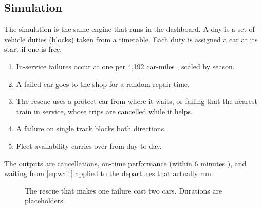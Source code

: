 \documentclass[11pt]{article}
\begin{document}
\subsection{Simulation}
The simulation is the same engine that runs in the dashboard. A day is a set of vehicle duties (blocks) taken from a timetable. Each duty is assigned a car at its start if one is free.
\begin{enumerate}
\item In-service failures occur at one per 4{,}192 car-miles \citep{roinj2025riverline}, scaled by season.
\item A failed car goes to the shop for a random repair time.
\item The rescue uses a protect car from where it waits, or failing that the nearest train in service, whose trips are cancelled while it helps.
\item A failure on single track blocks both directions.
\item Fleet availability carries over from day to day.
\end{enumerate}
The outputs are cancellations, on-time performance (within 6 minutes \citep{njt2019otp}), and waiting from \eqref{eq:wait} applied to the departures that actually run.

\begin{figure}[ht]\centering
{}
\caption{The rescue that makes one failure cost two cars. Durations are placeholders.}\label{fig:loop}
\end{figure}
\end{document}
